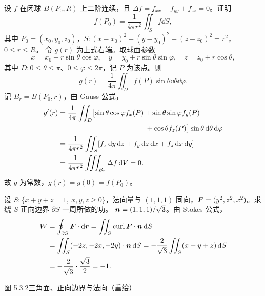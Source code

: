 设 $f$ 在闭球 $B(P_0,R)$ 上二阶连续，且 $\Delta f=f_{xx}+f_{yy}+f_{zz}=0$。证明
\[
f(P_0)=\frac1{4\pi r^2}\iint_Sf\dd S,
\]
其中 $P_0=(x_0,y_0,z_0)$，$S:(x-x_0)^2+(y-y_0)^2+(z-z_0)^2=r^2$，$0\le r\le R$。
\prooftext 令 $g(r)$ 为上式右端。取球面参数
\[
x=x_0+r\sin\theta\cos\varphi,\quad y=y_0+r\sin\theta\sin\varphi,\quad z=z_0+r\cos\theta,
\]
其中 $D:0\le\theta\le\pi$、$0\le\varphi\le2\pi$，记 $P$ 为该点。则
\[
g(r)=\frac1{4\pi}\iint_Df(P)\sin\theta\dd\theta\dd\varphi.
\]
记 $B_r=B(P_0,r)$，由 Gauss 公式，
\begin{align*}
g'(r)&=\frac1{4\pi}\iint_D\bigl[\sin\theta\cos\varphi f_x(P)+\sin\theta\sin\varphi f_y(P)\\
&\hspace{43mm}+\cos\theta f_z(P)\bigr]\sin\theta\dd\theta\dd\varphi\\
&=\frac1{4\pi r^2}\iint_S[f_x\dd y\dd z+f_y\dd z\dd x+f_z\dd x\dd y]\\
&=\frac1{4\pi r^2}\iiint_{B_r}\Delta f\dd V=0.
\end{align*}
故 $g$ 为常数，$g(r)=g(0)=f(P_0)$。

设 $S:\{x+y+z=1,\ x,y,z\ge0\}$，法向量与 $(1,1,1)$ 同向，$\bm{F}=(y^2,z^2,x^2)$。求绕 $S$ 正向边界 $\partial S$ 一周所做的功。
\sol $\bm{n}=(1,1,1)/\sqrt3$。由 Stokes 公式，
\begin{align*}
W&=\oint_{\partial S}\bm{F}\cdot\mathop{}\!\mathrm d\bm{r}=\iint_S\operatorname{curl}\bm{F}\cdot\bm{n}\mathop{}\!\mathrm d S\\
&=\iint_S(-2z,-2x,-2y)\cdot\bm{n}\mathop{}\!\mathrm d S
=-\frac2{\sqrt3}\iint_S(x+y+z)\mathop{}\!\mathrm d S\\
&=-\frac2{\sqrt3}\cdot\frac{\sqrt3}{2}=-1.
\end{align*}
\begin{center}\begin{minipage}{\linewidth}\centering
{}\par{\small 图 5.3.2\quad 三角面、正向边界与法向（重绘）}
\end{minipage}\end{center}

